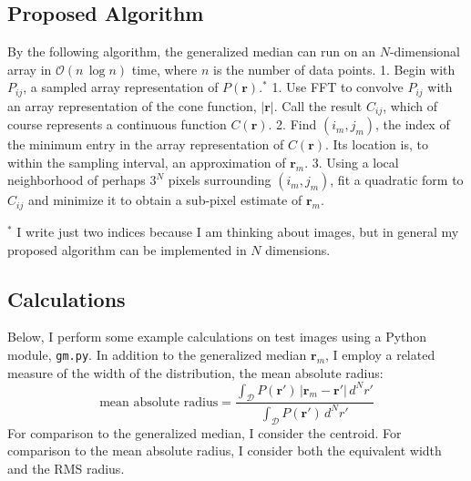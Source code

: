 \documentclass[11pt]{article}
\begin{document}
    \subsection{Proposed Algorithm}\label{proposed-algorithm}

By the following algorithm, the generalized median can run on an
\(N\)-dimensional array in \(\mathcal{O}\left(n\,\log n \right)\) time,
where \(n\) is the number of data points. 1. Begin with \(P_{ij}\), a
sampled array representation of \(P(\mathbf{r})\).\(^*\) 1. Use FFT to
convolve \(P_{ij}\) with an array representation of the cone function,
\(\left| \mathbf{r} \right|\). Call the result \(C_{ij}\), which of
course represents a continuous function \(C(\mathbf{r})\). 2. Find
\((i_m,j_m)\), the index of the minimum entry in the array
representation of \(C(\mathbf{r})\). Its location is, to within the
sampling interval, an approximation of \(\mathbf{r}_m\). 3. Using a
local neighborhood of perhaps \(3^N\) pixels surrounding \((i_m,j_m)\),
fit a quadratic form to \(C_{ij}\) and minimize it to obtain a sub-pixel
estimate of \(\mathbf{r}_m\).

\(^*\) I write just two indices because I am thinking about images, but
in general my proposed algorithm can be implemented in \(N\) dimensions.

    \subsection{Calculations}\label{calculations}

Below, I perform some example calculations on test images using a Python
module, \texttt{gm.py}. In addition to the generalized median
\(\mathbf{r}_m\), I employ a related measure of the width of the
distribution, the mean absolute radius: \[
    \text{mean absolute radius} = 
    \frac{
        \int_{\mathcal{D}} P(\mathbf{r'})\,\left| \mathbf{r}_m - \mathbf{r}' \right| \,d^N r'
    }{
        \int_{\mathcal{D}} P(\mathbf{r'})\,d^N r'
    }
\] For comparison to the generalized median, I consider the centroid.
For comparison to the mean absolute radius, I consider both the
equivalent width and the RMS radius.
\end{document}
